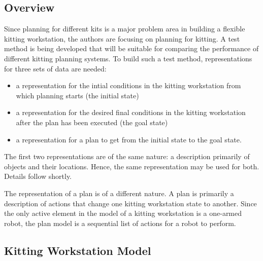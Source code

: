 \renewcommand{\topfraction}{1.0}
\setcounter{topnumber}{10}

\subsection{Overview}

Since planning for different kits is a major problem area in building a
flexible kitting workstation, the authors are focusing on planning for
kitting.  A test method is being developed that will be suitable for
comparing the performance of different kitting planning systems.  To build
such a test method, representations for three sets of data are needed:
\begin{itemize}
\item a representation for the intial conditions in the kitting workstation
 from which planning starts (the initial state)

\item a representation for the desired final conditions in the kitting 
workstation after the plan has been executed (the goal state)

\item a representation for a plan to get from the initial state to the goal
state.
\end{itemize}

The first two representations are of the same nature: a description
primarily of objects and their locations. Hence, the same representation
may be used for both. Details follow shortly.

The representation of a plan is of a different nature. A plan is primarily
a description of actions that change one kitting workstation state to
another. Since the only active element in the model of a kitting
workstation is a one-armed robot, the plan model is a sequential
list of actions for a robot to perform.

\subsection{Kitting Workstation Model}

